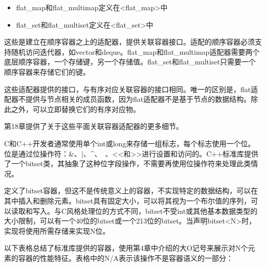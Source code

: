 \begin{itemize}
\item
flat\_map和flat\_multimap定义在<flat\_map>中

\item
flat\_set和flat\_multiset定义在<flat\_set>中
\end{itemize}

这些是建立在顺序容器之上的适配器，提供关联容器接口。适配的顺序容器必须支持随机访问迭代器，如vector和deque。flat\_map和flat\_multimap适配器需要两个底层顺序容器，一个存储键，另一个存储值。flat\_set和flat\_multiset只需要一个顺序容器来存储它们的键。

这些适配器提供的接口，与有序对应关联容器的接口相同。唯一的区别是，flat适配器不提供与节点相关的成员函数，因为flat适配器不是基于节点的数据结构。除此之外，可以立即替换它们的有序对应物。

第18章提供了关于这些平面关联容器适配器的更多细节。


C和C++开发者通常使用单个int或long来存储一组标志，每个标志使用一个位。位是通过位操作符：\&、|、\^{}、~、<{}<和>{}>进行设置和访问的。C++标准库提供了一个bitset类，其抽象了这种位字段操作，不需要再使用位操作符来处理此类情况。

定义了bitset容器，但这不是传统意义上的容器，不实现特定的数据结构，可以在其中插入和删除元素。bitset具有固定大小，可以将其视为一个布尔值的序列，可以读取和写入。与C风格处理位的方式不同，bitset不受int或其他基本数据类型的大小限制，可以有一个40位的bitset或一个213位的bitset。当声明bitset<N>时，实现将使用所需存储来实现N位。


以下表格总结了标准库提供的容器，使用第4章中介绍的大O记号来展示对N个元素的容器的性能特征。表格中的N/A表示该操作不是容器语义的一部分：

